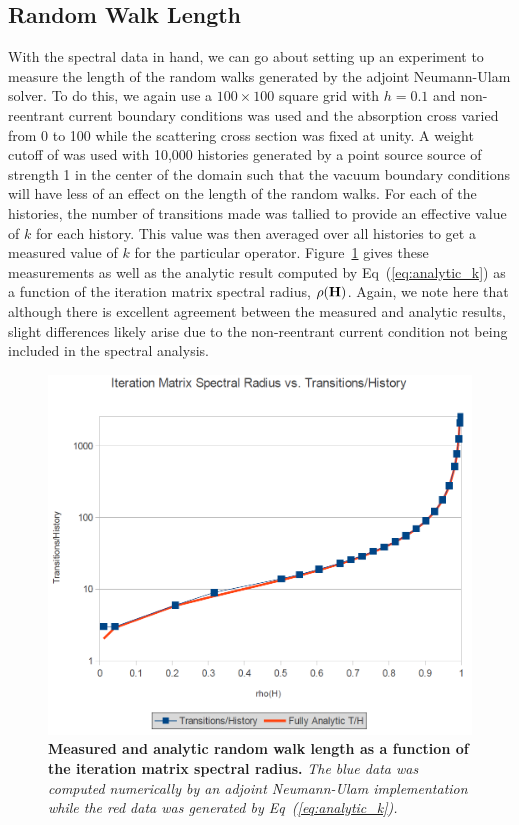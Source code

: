 \documentclass[letterpaper,12pt]{article}
\begin{document}
\subsection{Random Walk Length}
With the spectral data in hand, we can go about setting up an
experiment to measure the length of the random walks generated by the
adjoint Neumann-Ulam solver. To do this, we again use a $100 \times
100$ square grid with $h=0.1$ and non-reentrant current boundary
conditions was used and the absorption cross varied from 0 to 100
while the scattering cross section was fixed at unity. A weight cutoff
of  was used with 10,000 histories generated by a point
source source of strength 1 in the center of the domain such that the
vacuum boundary conditions will have less of an effect on the length
of the random walks. For each of the histories, the number of
transitions made was tallied to provide an effective value of $k$ for
each history. This value was then averaged over all histories to get a
measured value of $k$ for the particular
operator. Figure~\ref{fig:measured_length} gives these measurements as
well as the analytic result computed by Eq~(\ref{eq:analytic_k}) as a
function of the iteration matrix spectral radius,
$\rho(\mathbf{H})$. Again, we note here that although there is excellent
agreement between the measured and analytic results, slight
differences likely arise due to the non-reentrant current condition
not being included in the spectral analysis.
\begin{figure}[t!]
  \begin{center}
    \includegraphics[width=5in,clip]{measured_length.png}
  \end{center}
  \caption{\textbf{Measured and analytic random walk length as a
      function of the iteration matrix spectral radius.} \textit{The
      blue data was computed numerically by an adjoint Neumann-Ulam
      implementation while the red data was generated by
      Eq~(\ref{eq:analytic_k}).}}
  \label{fig:measured_length}
\end{figure}
\end{document}
